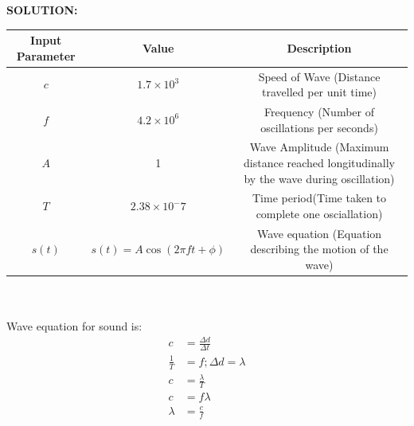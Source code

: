 \documentclass[journal,12pt,twocolumn]{IEEEtran}
\theoremstyle{remark}
\begin{document}
\bigskip
\Large
\textbf{SOLUTION:} \\
\begin{table}[h]
    \centering
    
    \begin{tabular}{|c|c|c|}
        \hline
        Input Parameter & Value & Description \\
        \hline
        $c$ & $1.7\times10^3$ & Speed of Wave (Distance travelled per unit time)  \\
        \hline
        $f$ & $4.2\times10^6$ & Frequency (Number of oscillations per seconds)  \\
        \hline
        $A$ & 1 & Wave Amplitude (Maximum distance reached longitudinally by the wave during oscillation) \\
        \hline
        $T$ & $2.38\times10^-7$ & Time period(Time taken to complete one osciallation) \\
        \hline
        $s(t)$ & $s(t)=A\cos(2\pi f t+\phi)$ & Wave equation (Equation describing the motion of the wave) \\
        \hline
    \end{tabular}
    
\end{table} \\ \\
Wave equation for sound is: \\
\begin{align}
c&=\frac{\Delta d}{\Delta t} \\ 
\frac{1}{T}&= f ; \Delta d= \lambda \\
c&=\frac{\lambda}{T}  \\
c&=f\lambda \\
\lambda&=\frac{c}{f}
\end{align}
\\
\\ \\ \\ \\ \\ \\
\\ \\ \\ \\ \\ \\ \\ \\ \\ \\ \\
\end{document}
